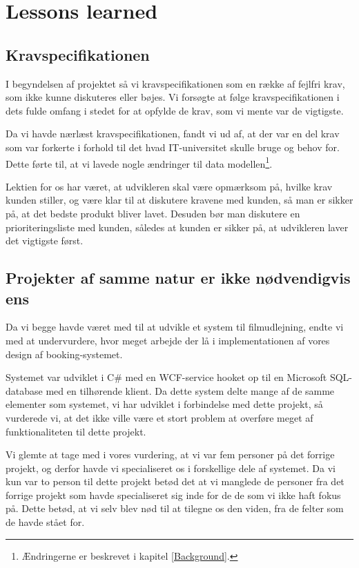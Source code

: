 \chapter{Lessons learned}
\label{Conclusion_Lessons}
\section{Kravspecifikationen}
\label{Lessons_Krav}
I begyndelsen af projektet så vi kravspecifikationen som en række af fejlfri krav, som ikke kunne diskuteres eller bøjes. Vi forsøgte at følge kravspecifikationen i dets fulde omfang i stedet for at opfylde de krav, som vi mente var de vigtigste.

Da vi havde nærlæst kravspecifikationen, fandt vi ud af, at der var en del krav som var forkerte i forhold til det hvad IT-universitet skulle bruge og behov for. Dette førte til, at vi lavede nogle ændringer til data modellen\footnote{Ændringerne er beskrevet i kapitel \ref{Background}.}.

Lektien for os har været, at udvikleren skal være opmærksom på, hvilke krav kunden stiller, og være klar til at diskutere kravene med kunden, så man er sikker på, at det bedste produkt bliver lavet. Desuden bør man diskutere en prioriteringsliste med kunden, således at kunden er sikker på, at udvikleren laver det vigtigste først.

\section{Projekter af samme natur er ikke nødvendigvis ens}
\label{Lessons_Projekt}
Da vi begge havde været med til at udvikle et system til filmudlejning, endte vi med at undervurdere, hvor meget arbejde der lå i implementationen af vores design af booking-systemet.

Systemet var udviklet i C\# med en WCF-service hooket op til en Microsoft SQL-database med en tilhørende klient. Da dette system delte mange af de samme elementer som systemet, vi har udviklet i forbindelse med dette projekt, så vurderede vi, at det ikke ville være et stort problem at overføre meget af funktionaliteten til dette projekt.

Vi glemte at tage med i vores vurdering, at vi var fem personer på det forrige projekt, og derfor havde vi specialiseret os i forskellige dele af systemet. Da vi kun var to person til dette projekt betød det at vi manglede de personer fra det forrige projekt som havde specialiseret sig inde for de de som vi ikke haft fokus på. Dette betød, at vi selv blev nød til at tilegne os den viden, fra de felter som de havde stået for.

